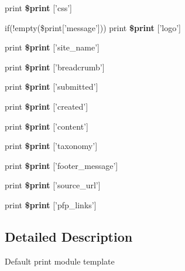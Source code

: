 \begin{CompactItemize}
\item 
\hypertarget{print_8tpl_8php_8dc54582eae08900d125996876a0989d}{
print \textbf{\$print} \mbox{[}'css'\mbox{]}}
\label{print_8tpl_8php_8dc54582eae08900d125996876a0989d}

\item 
\hypertarget{print_8tpl_8php_2da00d3636dc09569f3e5ec6d1f8340b}{
if(!empty(\$print\mbox{[}'message'\mbox{]})) print \textbf{\$print} \mbox{[}'logo'\mbox{]}}
\label{print_8tpl_8php_2da00d3636dc09569f3e5ec6d1f8340b}

\item 
\hypertarget{print_8tpl_8php_ffd662f6722d5d21a35efdb9f42f6ab8}{
print \textbf{\$print} \mbox{[}'site\_\-name'\mbox{]}}
\label{print_8tpl_8php_ffd662f6722d5d21a35efdb9f42f6ab8}

\item 
\hypertarget{print_8tpl_8php_8ac747148da1950a35975f0a40b8fdf3}{
print \textbf{\$print} \mbox{[}'breadcrumb'\mbox{]}}
\label{print_8tpl_8php_8ac747148da1950a35975f0a40b8fdf3}

\item 
\hypertarget{print_8tpl_8php_598ca46c66e13b769b4d86bfd88ea8fc}{
print \textbf{\$print} \mbox{[}'submitted'\mbox{]}}
\label{print_8tpl_8php_598ca46c66e13b769b4d86bfd88ea8fc}

\item 
\hypertarget{print_8tpl_8php_88cd9d319d9bc8930ca460554ce57ccc}{
print \textbf{\$print} \mbox{[}'created'\mbox{]}}
\label{print_8tpl_8php_88cd9d319d9bc8930ca460554ce57ccc}

\item 
\hypertarget{print_8tpl_8php_d3cd8db15c1f04266fb39b7d29210a4f}{
print \textbf{\$print} \mbox{[}'content'\mbox{]}}
\label{print_8tpl_8php_d3cd8db15c1f04266fb39b7d29210a4f}

\item 
\hypertarget{print_8tpl_8php_153cbc4b979cc8018264e66ea7b6ae31}{
print \textbf{\$print} \mbox{[}'taxonomy'\mbox{]}}
\label{print_8tpl_8php_153cbc4b979cc8018264e66ea7b6ae31}

\item 
\hypertarget{print_8tpl_8php_447500206eddb4a8b115a9c558ca76d0}{
print \textbf{\$print} \mbox{[}'footer\_\-message'\mbox{]}}
\label{print_8tpl_8php_447500206eddb4a8b115a9c558ca76d0}

\item 
\hypertarget{print_8tpl_8php_866da0f24ccc013979efe5125065636b}{
print \textbf{\$print} \mbox{[}'source\_\-url'\mbox{]}}
\label{print_8tpl_8php_866da0f24ccc013979efe5125065636b}

\item 
\hypertarget{print_8tpl_8php_20e84506be3fa3324cf0dc223ce384af}{
print \textbf{\$print} \mbox{[}'pfp\_\-links'\mbox{]}}
\label{print_8tpl_8php_20e84506be3fa3324cf0dc223ce384af}

\end{CompactItemize}


\subsection{Detailed Description}
Default print module template 